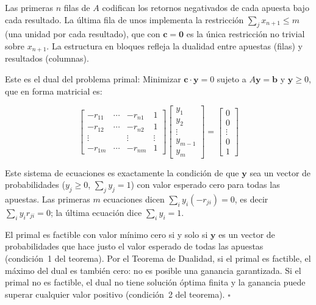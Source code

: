 \documentclass[12pt]{article}
\begin{document}
\begin{intuicionmat}
Las primeras $n$ filas de $A$ codifican los retornos negativados de cada
apuesta bajo cada resultado. La \'ultima fila de unos implementa la restricci\'on
$\sum_j x_{n+1} \leq m$ (una unidad por cada resultado), que con $\mathbf{c} = \mathbf{0}$
es la \'unica restricci\'on no trivial sobre $x_{n+1}$. La estructura en
bloques refleja la dualidad entre apuestas (filas) y resultados (columnas).
\end{intuicionmat}

Este es el dual del problema primal: Minimizar $\mathbf{c} \cdot \mathbf{y} = 0$
sujeto a $A\mathbf{y} = \mathbf{b}$ y $\mathbf{y} \geq 0$, que en forma
matricial es:

\begin{equation}
  \begin{bmatrix}
    -r_{11} & \cdots & -r_{n1} & 1 \\
    -r_{12} & \cdots & -r_{n2} & 1 \\
    \vdots  &        & \vdots  & \vdots \\
    -r_{1m} & \cdots & -r_{nm} & 1
  \end{bmatrix}
  \begin{bmatrix} y_1 \\ y_2 \\ \vdots \\ y_{m-1} \\ y_m \end{bmatrix}
  =
  \begin{bmatrix} 0 \\ 0 \\ \vdots \\ 0 \\ 1 \end{bmatrix}
\end{equation}

\begin{intuicionmat}
Este sistema de ecuaciones es exactamente la condici\'on de que $\mathbf{y}$
sea un vector de probabilidades ($y_j \geq 0$, $\sum_j y_j = 1$) con valor
esperado cero para todas las apuestas. Las primeras $m$ ecuaciones dicen
$\sum_{i} y_i (-r_{ji}) = 0$, es decir $\sum_i y_i r_{ji} = 0$; la \'ultima
ecuaci\'on dice $\sum_i y_i = 1$.
\end{intuicionmat}

El primal es factible con valor m\'inimo cero si y solo si $\mathbf{y}$ es un
vector de probabilidades que hace justo el valor esperado de todas las apuestas
(condici\'on~1 del teorema). Por el Teorema de Dualidad, si el primal es
factible, el m\'aximo del dual es tambi\'en cero: no es posible una ganancia
garantizada. Si el primal no es factible, el dual no tiene soluci\'on \'optima
finita y la ganancia puede superar cualquier valor positivo
(condici\'on~2 del teorema). $\square$
\end{document}
